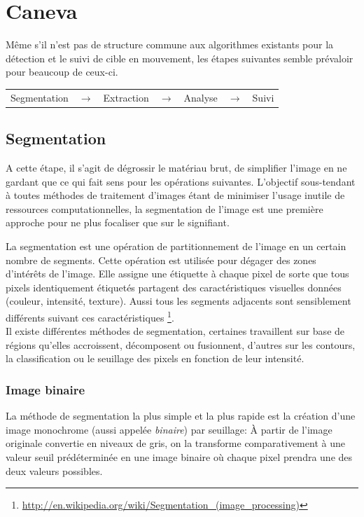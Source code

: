\documentclass[a4paper,12pt]{report}
\begin{document}
\section{Caneva}
Même s'il n'est pas de structure commune aux algorithmes existants pour la détection et le suivi de cible en mouvement, les étapes suivantes semble prévaloir pour beaucoup de ceux-ci.\\
\begin{center}
\begin{tabular}{ c c c c c c c } 
\cellcolor[gray]{0.9} Segmentation & $\rightarrow$ & \cellcolor[gray]{0.9} Extraction & $\rightarrow$ & \cellcolor[gray]{0.9} Analyse & $\rightarrow$ & \cellcolor[gray]{0.9} Suivi\\  
\end{tabular} 
\end{center}

\subsection{Segmentation}
A cette étape, il s'agit de dégrossir le matériau brut, de simplifier l'image en ne gardant que ce qui fait sens pour les opérations suivantes. L'objectif sous-tendant à toutes méthodes de traitement d'images étant de minimiser l'usage inutile de ressources computationnelles, la segmentation de l'image est une première approche pour ne plus focaliser que sur le signifiant. 

La segmentation est une opération de partitionnement de l'image en un certain nombre de segments. Cette opération est utilisée pour dégager des zones d'intérêts de l'image. Elle assigne une étiquette à chaque pixel de sorte que tous pixels identiquement étiquetés partagent des caractéristiques visuelles données (couleur, intensité, texture). Aussi tous les segments adjacents sont sensiblement différents suivant ces caractéristiques \footnote{\url{http://en.wikipedia.org/wiki/Segmentation_(image_processing)}}.\\

Il existe différentes méthodes de segmentation, certaines travaillent sur base de régions qu'elles accroissent, décomposent ou fusionnent, d'autres sur les contours, la classification ou le seuillage des pixels en fonction de leur intensité.

\subsubsection{Image binaire}
La méthode de segmentation la plus simple et la plus rapide est la création d'une image monochrome (aussi appelée \textit{binaire}) par seuillage: \`A partir de l'image originale convertie en niveaux de gris, on la transforme comparativement à une valeur seuil prédéterminée en une image binaire où chaque pixel prendra une des deux valeurs possibles.\\
\end{document}
